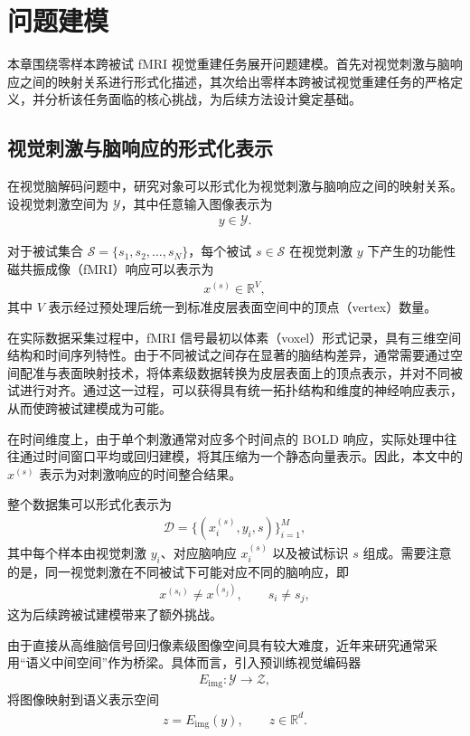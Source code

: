 
\chapter{问题建模}

本章围绕零样本跨被试 fMRI 视觉重建任务展开问题建模。首先对视觉刺激与脑响应之间的映射关系进行形式化描述，其次给出零样本跨被试视觉重建任务的严格定义，并分析该任务面临的核心挑战，为后续方法设计奠定基础。

\section{视觉刺激与脑响应的形式化表示}

在视觉脑解码问题中，研究对象可以形式化为视觉刺激与脑响应之间的映射关系。设视觉刺激空间为 $\mathcal{Y}$，其中任意输入图像表示为
\begin{align}
  y \in \mathcal{Y}.
\end{align}

对于被试集合 $\mathcal{S}=\{s_1,s_2,\dots,s_N\}$，每个被试 $s \in \mathcal{S}$ 在视觉刺激 $y$ 下产生的功能性磁共振成像（fMRI）响应可以表示为
\begin{align}
  x^{(s)} \in \mathbb{R}^{V},
\end{align}
其中 $V$ 表示经过预处理后统一到标准皮层表面空间中的顶点（vertex）数量。

在实际数据采集过程中，fMRI 信号最初以体素（voxel）形式记录，具有三维空间结构和时间序列特性。由于不同被试之间存在显著的脑结构差异，通常需要通过空间配准与表面映射技术，将体素级数据转换为皮层表面上的顶点表示，并对不同被试进行对齐。通过这一过程，可以获得具有统一拓扑结构和维度的神经响应表示，从而使跨被试建模成为可能。

在时间维度上，由于单个刺激通常对应多个时间点的 BOLD 响应，实际处理中往往通过时间窗口平均或回归建模，将其压缩为一个静态向量表示。因此，本文中的 $x^{(s)}$ 表示为对刺激响应的时间整合结果。

整个数据集可以形式化表示为
\begin{align}
  \mathcal{D} = \{(x_i^{(s)}, y_i, s)\}_{i=1}^{M},
\end{align}
其中每个样本由视觉刺激 $y_i$、对应脑响应 $x_i^{(s)}$ 以及被试标识 $s$ 组成。需要注意的是，同一视觉刺激在不同被试下可能对应不同的脑响应，即
\begin{align}
  x^{(s_i)} \neq x^{(s_j)}, \qquad s_i \neq s_j,
\end{align}
这为后续跨被试建模带来了额外挑战。

由于直接从高维脑信号回归像素级图像空间具有较大难度，近年来研究通常采用“语义中间空间”作为桥梁。具体而言，引入预训练视觉编码器
\begin{align}
  E_{\mathrm{img}}: \mathcal{Y} \rightarrow \mathcal{Z},
\end{align}
将图像映射到语义表示空间
\begin{align}
  z = E_{\mathrm{img}}(y), \qquad z \in \mathbb{R}^{d}.
\end{align}

